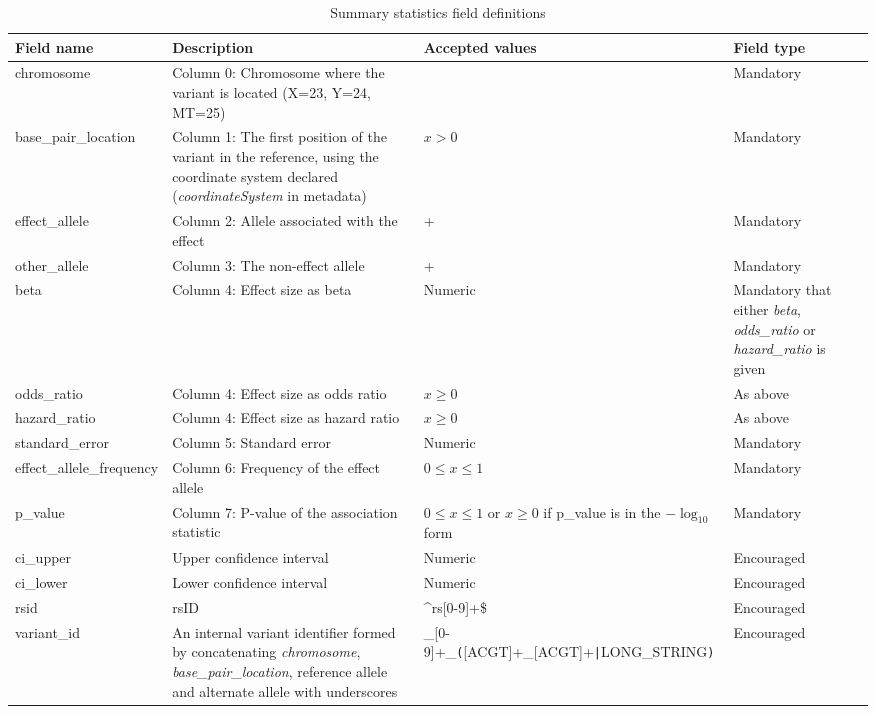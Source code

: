 \documentclass[11pt]{article}
\begin{document}
\begin{landscape}
\begin{table}[h]
 \begin{threeparttable}
  \caption{Summary statistics field definitions}
  \centering
  \small
  \begin{tabularx}{\linewidth} { 
    | >{\hsize=0.7\hsize\centering\arraybackslash}X 
    | >{\hsize=1\hsize\centering\arraybackslash}X 
    | >{\hsize=1.9\hsize\centering\arraybackslash}X 
    | >{\hsize=0.4\hsize\centering\arraybackslash}X | } 
   \hline
   Field name & Description & Accepted values & Field type \\
   \hline
   chromosome & Column 0: Chromosome where the variant is located (X=23, Y=24, MT=25) & [1-25] & Mandatory\\
   base\_pair\_location & Column 1: The first position of the variant in the reference, using the coordinate system declared (\textit{coordinateSystem} in metadata)  & $x > 0$ & Mandatory\\
   effect\_allele & Column 2: Allele associated with the effect & [ACGT]+ & Mandatory\\
   other\_allele & Column 3: The non-effect allele & [ACGT]+ & Mandatory\\
   beta & Column 4: Effect size as beta & Numeric & Mandatory that either \textit{beta}, \textit{odds\_ratio} or \textit{hazard\_ratio} is given\\
   odds\_ratio & Column 4: Effect size as odds ratio & $x \ge 0$ & As above\\
   hazard\_ratio & Column 4: Effect size as hazard ratio & $x \ge 0$ & As above\\
   standard\_error & Column 5: Standard error & Numeric & Mandatory\\
   effect\_allele\_frequency & Column 6: Frequency of the effect allele & $0 \le x \le 1$\tnote{b} & Mandatory\\
   p\_value & Column 7: P-value of the association statistic & $0 \le x \le 1$ or $x \ge 0$ if p\_value is in the $-\log_{10}$ form\tnote{a} & Mandatory \\
   ci\_upper & Upper confidence interval & Numeric & Encouraged\\
   ci\_lower & Lower confidence interval & Numeric & Encouraged\\
   rsid & rsID & \^{}rs[0-9]+\$ & Encouraged\\
   variant\_id & An internal variant identifier formed by concatenating \textit{chromosome}, \textit{base\_pair\_location}, reference allele and alternate allele with underscores & [1-25]\_[0-9]+\_\texttt{(}[ACGT]+\_[ACGT]+\texttt{|}LONG\_STRING\texttt{)}\tnote{c} & Encouraged\\

\end{tabularx}
\end{threeparttable}
\end{table}
\end{landscape}
\end{document}

